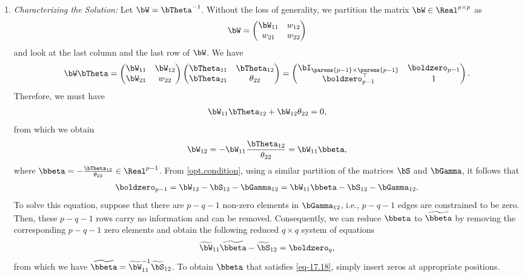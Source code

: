 \documentclass[12pt]{article}
\begin{document}
\begin{enumerate}[label=\textbf{\arabic*.}]
\begin{enumerate}
		\item \textit{Characterizing the Solution:} Let $\bW = \bTheta^{-1}$. Without the loss of generality, we partition the matrix $\bW \in \Real^{p \times p}$ as 
		\begin{align*}
			\bW = \begin{pmatrix}
				\bW_{11} & w_{12} \\ 
				w_{21} & w_{22}
			\end{pmatrix}
		\end{align*}
		and look at the last column and the last row of $\bW$. We have 
		\begin{align}\label{eq-17.15}
			\bW \bTheta = \begin{pmatrix}
				\bW_{11} & \bW_{12} \\ 
				\bW_{21} & w_{22}
			\end{pmatrix} \begin{pmatrix}
				\bTheta_{11} & \bTheta_{12} \\ 
				\bTheta_{21} & \theta_{22}
			\end{pmatrix} = \begin{pmatrix}
				\bI_{\parens{p-1} \times \parens{p-1}} & \boldzero_{p-1} \\ \boldzero_{p-1}^\top & 1
			\end{pmatrix}. 
		\end{align}
		Therefore, we must have 
		\begin{align*}
			\bW_{11} \bTheta_{12} + \bW_{12} \theta_{22} = 0, 
		\end{align*}
		from which we obtain 
		\begin{align*}
			\bW_{12} = - \bW_{11} \frac{\bTheta_{12}}{\theta_{22}} = \bW_{11} \bbeta, 
		\end{align*}
		where $\bbeta = - \frac{\bTheta_{12}}{\theta_{22}} \in \Real^{p-1}$. From \eqref{opt.condition}, using a similar partition of the matrices $\bS$ and $\bGamma$, it follows that 
		\begin{align}\label{eq-17.18}
			\boldzero_{p-1} = \bW_{12} - \bS_{12} - \bGamma_{12} = \bW_{11} \bbeta - \bS_{12} - \bGamma_{12}. 
		\end{align}
		To solve this equation, suppose that there are $p - q - 1$ non-zero elements in $\bGamma_{12}$, i.e., $p - q - 1$ edges are constrained to be zero. Then, these $p - q - 1$ rows carry no information and can be removed. Consequently, we can reduce $\bbeta$ to $\widetilde{\bbeta}$ by removing the corresponding $p - q - 1$ zero elements and obtain the following reduced $q \times q$ system of equations 
		\begin{align}\label{17.19}
			\widetilde{\bW}_{11} \widetilde{\bbeta} - \widetilde{\bS}_{12} = \boldzero_{q}, 
		\end{align}
		from which we have $\widetilde{\bbeta} = \widetilde{\bW}_{11}^{-1} \widetilde{\bS}_{12}$. To obtain $\bbeta$ that satisfies \eqref{eq-17.18}, simply insert zeros at appropriate positions. 
		

\end{enumerate}
\end{enumerate}
\end{document}
